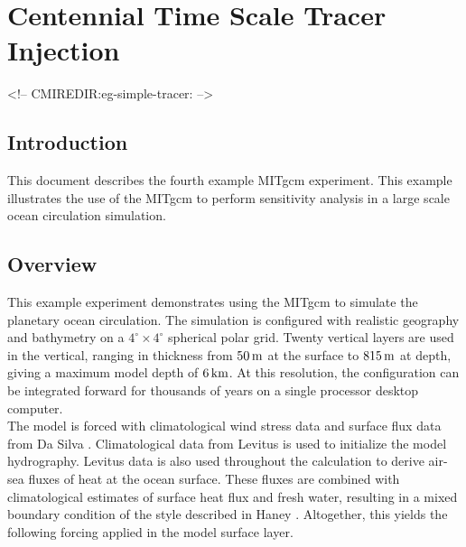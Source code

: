 
\section{Centennial Time Scale Tracer Injection}
\label{www:tutorials}
\label{sect:eg-simple-tracer}
\begin{rawhtml}
<!-- CMIREDIR:eg-simple-tracer: -->
\end{rawhtml}


%
%

\subsection{Introduction}
\label{www:tutorials}

This document describes the fourth example MITgcm experiment.
This example illustrates the use of
the MITgcm to perform sensitivity analysis in a
large scale ocean circulation simulation.

\subsection{Overview}
\label{www:tutorials}

This example experiment demonstrates using the MITgcm to simulate
the planetary ocean circulation. The simulation is configured
with realistic geography and bathymetry on a
$4^{\circ} \times 4^{\circ}$ spherical polar grid.
Twenty vertical layers are used in the vertical, ranging in thickness
from $50\,{\rm m}$ at the surface to $815\,{\rm m}$ at depth,
giving a maximum model depth of $6\,{\rm km}$.
At this resolution, the configuration
can be integrated forward for thousands of years on a single 
processor desktop computer.
\\

The model is forced with climatological wind stress data and surface
flux data from Da Silva \cite{DaSilva94}. Climatological data
from Levitus \cite{Levitus94} is used to initialize the model hydrography.
Levitus data is also used throughout the calculation
to derive air-sea fluxes of heat at the ocean surface.
These fluxes are combined with climatological estimates of
surface heat flux and fresh water, resulting in a mixed boundary
condition of the style described in Haney \cite{Haney}.
Altogether, this yields the following forcing applied
in the model surface layer.

